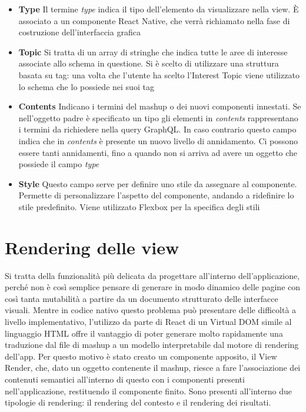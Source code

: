 \begin{itemize}
	\item \textbf{Type}
	Il termine \emph{type} indica il tipo dell'elemento da visualizzare nella view. È associato a un componente React Native, che verrà richiamato nella fase di costruzione dell'interfaccia grafica
	\item \textbf{Topic}
	Si tratta di un array di stringhe che indica tutte le aree di interesse associate allo schema in questione. Si è scelto di utilizzare una struttura basata su tag: una volta che l’utente ha scelto l’Interest Topic viene utilizzato lo schema che lo possiede nei suoi tag 
	\item \textbf{Contents}
	Indicano i termini del mashup o dei nuovi componenti innestati. Se nell'oggetto padre è specificato un tipo gli elementi in \emph{contents} rappresentano i termini da richiedere nella query GraphQL. In caso contrario questo campo indica che in \emph{contents} è presente un nuovo livello di annidamento. Ci possono essere tanti annidamenti, fino a quando non si arriva ad avere un oggetto che possiede il campo \emph{type}
	\item \textbf{Style}
	Questo campo serve per definire uno stile da assegnare al componente. Permette di personalizzare l’aspetto del componente, andando a ridefinire lo stile predefinito. Viene utilizzato Flexbox per la specifica degli stili
\end{itemize}

\section{Rendering delle view}\label{sec:rendering-view}

Si tratta della funzionalità più delicata da progettare all'interno dell'applicazione, perché non è così semplice pensare di generare in modo dinamico delle pagine con così tanta mutabilità a partire da un documento strutturato delle interfacce visuali.
Mentre in codice nativo questo problema può presentare delle difficoltà a livello implementativo, l'utilizzo da parte di React di un Virtual DOM simile al linguaggio HTML offre il vantaggio di poter generare molto rapidamente una traduzione dal file di mashup a un modello interpretabile dal motore di rendering dell'app.
Per questo motivo è stato creato un componente apposito, il View Render, che, dato un oggetto contenente il mashup, riesce a fare l'associazione dei contenuti semantici all'interno di questo con i componenti presenti nell'applicazione, restituendo il componente finito.
Sono presenti all'interno due tipologie di rendering: il rendering del contesto e il rendering dei risultati.

